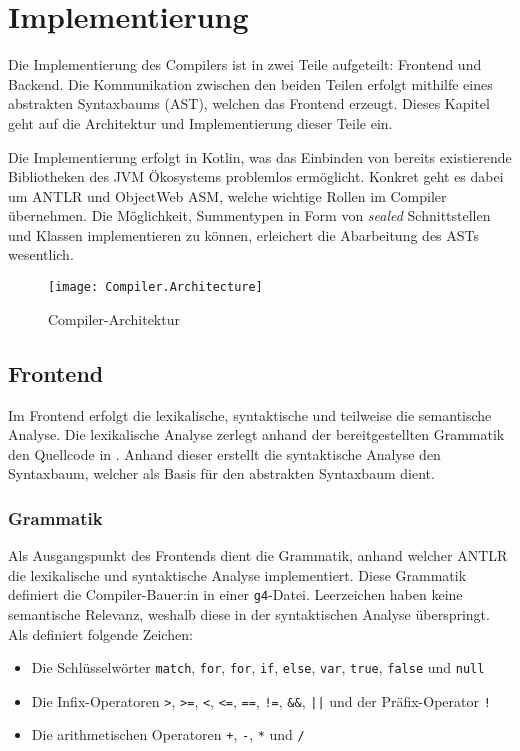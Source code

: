 \chapter{Implementierung}
\label{cha:implementation}

Die Implementierung des Compilers ist in zwei Teile aufgeteilt: Frontend und Backend. Die Kommunikation zwischen den beiden Teilen erfolgt mithilfe eines abstrakten Syntaxbaums (AST), welchen das Frontend erzeugt. Dieses Kapitel geht  auf die Architektur und Implementierung dieser Teile ein.

Die Implementierung erfolgt in Kotlin, was das Einbinden von bereits existierende Bibliotheken des JVM Ökosystems problemlos ermöglicht. Konkret geht es dabei um ANTLR und ObjectWeb ASM, welche wichtige Rollen im Compiler übernehmen. Die Möglichkeit, Summentypen in Form von \textit{sealed} Schnittstellen und Klassen implementieren zu können, erleichert die Abarbeitung des ASTs wesentlich.

\begin{figure}[h]
    \caption{Compiler-Architektur}
    \centering
    \texttt{[image: Compiler.Architecture]}
    \label{fig:compiler-architecture}
\end{figure}

\section{Frontend}

Im Frontend erfolgt die lexikalische, syntaktische und teilweise die semantische Analyse. Die lexikalische Analyse zerlegt anhand der bereitgestellten Grammatik den Quellcode in \token. Anhand dieser \token erstellt die syntaktische Analyse den Syntaxbaum, welcher als Basis für den abstrakten Syntaxbaum dient.

\subsection{Grammatik}

Als Ausgangspunkt des Frontends dient die Grammatik, anhand welcher ANTLR die lexikalische und syntaktische Analyse implementiert. Diese Grammatik definiert die Compiler-Bauer:in in einer \texttt{g4}-Datei. Leerzeichen haben keine semantische Relevanz, weshalb \toya diese in der syntaktischen Analyse überspringt. Als \token definiert \toya folgende Zeichen:

\begin{itemize}
    \item Die Schlüsselwörter \texttt{match}, \texttt{for}, \texttt{for}, \texttt{if}, \texttt{else}, \texttt{var}, \texttt{true}, \texttt{false} und \texttt{null}
    \item Die Infix-Operatoren \texttt{>}, \texttt{>=}, \texttt{<}, \texttt{<=}, \texttt{==}, \texttt{!=}, \texttt{\&\&}, \texttt{||} und der Präfix-Operator \texttt{!}
    \item Die arithmetischen Operatoren \texttt{+}, \texttt{-}, \texttt{*} und \texttt{/}
\end{itemize}

